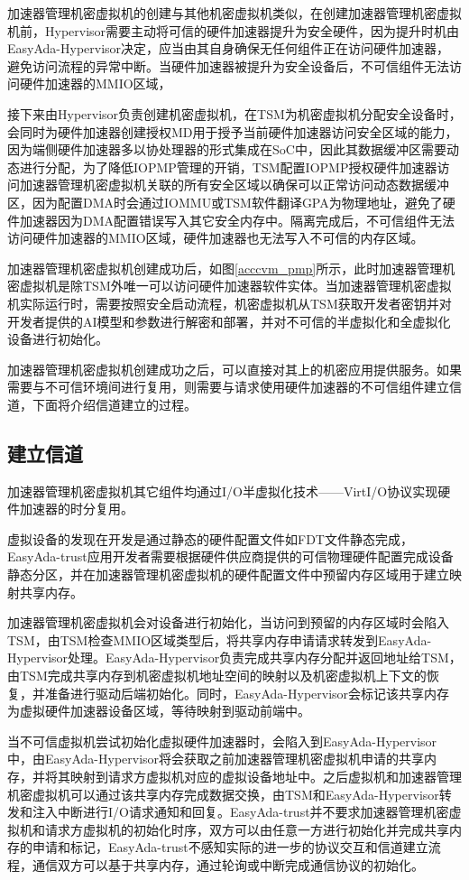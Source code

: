 \documentclass[master, vlined, review]{DissertUESTC}
\begin{document}
	加速器管理机密虚拟机的创建与其他机密虚拟机类似，在创建加速器管理机密虚拟机前，Hypervisor需要主动将可信的硬件加速器提升为安全硬件，因为提升时机由EasyAda-Hypervisor决定，应当由其自身确保无任何组件正在访问硬件加速器，避免访问流程的异常中断。当硬件加速器被提升为安全设备后，不可信组件无法访问硬件加速器的MMIO区域，
	
	
	接下来由Hypervisor负责创建机密虚拟机，在TSM为机密虚拟机分配安全设备时，会同时为硬件加速器创建授权MD用于授予当前硬件加速器访问安全区域的能力，因为端侧硬件加速器多以协处理器的形式集成在SoC中，因此其数据缓冲区需要动态进行分配，为了降低IOPMP管理的开销，TSM配置IOPMP授权硬件加速器访问加速器管理机密虚拟机关联的所有安全区域以确保可以正常访问动态数据缓冲区，因为配置DMA时会通过IOMMU或TSM软件翻译GPA为物理地址，避免了硬件加速器因为DMA配置错误写入其它安全内存中。隔离完成后，不可信组件无法访问硬件加速器的MMIO区域，硬件加速器也无法写入不可信的内存区域。
	
	加速器管理机密虚拟机创建成功后，如图\ref{acccvm_pmp}所示，此时加速器管理机密虚拟机是除TSM外唯一可以访问硬件加速器软件实体。当加速器管理机密虚拟机实际运行时，需要按照安全启动流程，机密虚拟机从TSM获取开发者密钥并对开发者提供的AI模型和参数进行解密和部署，并对不可信的半虚拟化和全虚拟化设备进行初始化。	

	加速器管理机密虚拟机创建成功之后，可以直接对其上的机密应用提供服务。如果需要与不可信环境间进行复用，则需要与请求使用硬件加速器的不可信组件建立信道，下面将介绍信道建立的过程。
	
	\subsection{建立信道}
	
	加速器管理机密虚拟机其它组件均通过I/O半虚拟化技术——VirtI/O协议实现硬件加速器的时分复用。
	
	虚拟设备的发现在开发是通过静态的硬件配置文件如FDT文件静态完成，EasyAda-trust应用开发者需要根据硬件供应商提供的可信物理硬件配置完成设备静态分区，并在加速器管理机密虚拟机的硬件配置文件中预留内存区域用于建立映射共享内存。
	
	加速器管理机密虚拟机会对设备进行初始化，当访问到预留的内存区域时会陷入TSM，由TSM检查MMIO区域类型后，将共享内存申请请求转发到EasyAda-Hypervisor处理。EasyAda-Hypervisor负责完成共享内存分配并返回地址给TSM，由TSM完成共享内存到机密虚拟机地址空间的映射以及机密虚拟机上下文的恢复，并准备进行驱动后端初始化。同时，EasyAda-Hypervisor会标记该共享内存为虚拟硬件加速器设备区域，等待映射到驱动前端中。
	
	当不可信虚拟机尝试初始化虚拟硬件加速器时，会陷入到EasyAda-Hypervisor中，由EasyAda-Hypervisor将会获取之前加速器管理机密虚拟机申请的共享内存，并将其映射到请求方虚拟机对应的虚拟设备地址中。之后虚拟机和加速器管理机密虚拟机可以通过该共享内存完成数据交换，由TSM和EasyAda-Hypervisor转发和注入中断进行I/O请求通知和回复。EasyAda-trust并不要求加速器管理机密虚拟机和请求方虚拟机的初始化时序，双方可以由任意一方进行初始化并完成共享内存的申请和标记，EasyAda-trust不感知实际的进一步的协议交互和信道建立流程，通信双方可以基于共享内存，通过轮询或中断完成通信协议的初始化。
\end{document}

